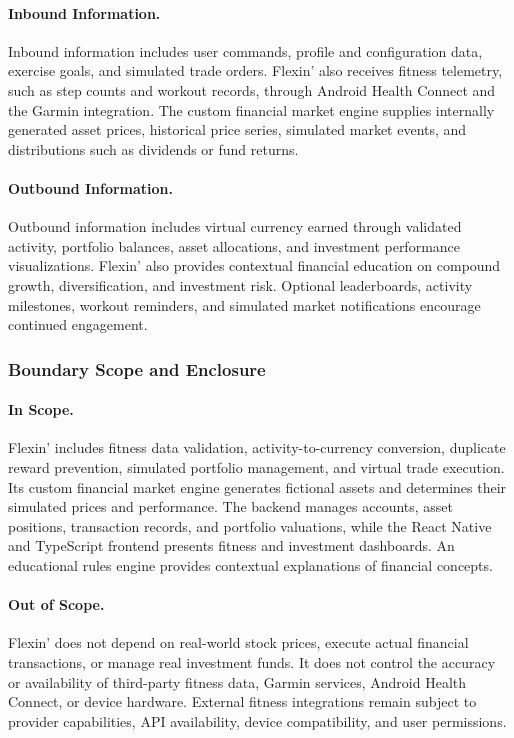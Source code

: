 \documentclass[12pt]{article}
\begin{document}
\paragraph{Inbound Information.}
Inbound information includes user commands, profile and configuration
data, exercise goals, and simulated trade orders. Flexin' also receives
fitness telemetry, such as step counts and workout records, through
Android Health Connect and the Garmin integration. The custom financial
market engine supplies internally generated asset prices, historical
price series, simulated market events, and distributions such as
dividends or fund returns.

\paragraph{Outbound Information.}
Outbound information includes virtual currency earned through validated
activity, portfolio balances, asset allocations, and investment
performance visualizations. Flexin' also provides contextual financial
education on compound growth, diversification, and investment risk.
Optional leaderboards, activity milestones, workout reminders, and
simulated market notifications encourage continued engagement.

\subsubsection{Boundary Scope and Enclosure}

\paragraph{In Scope.}
Flexin' includes fitness data validation, activity-to-currency
conversion, duplicate reward prevention, simulated portfolio
management, and virtual trade execution. Its custom financial market
engine generates fictional assets and determines their simulated
prices and performance. The backend manages accounts, asset positions,
transaction records, and portfolio valuations, while the React Native
and TypeScript frontend presents fitness and investment dashboards.
An educational rules engine provides contextual explanations of
financial concepts.

\paragraph{Out of Scope.}
Flexin' does not depend on real-world stock prices, execute actual
financial transactions, or manage real investment funds. It does not
control the accuracy or availability of third-party fitness data,
Garmin services, Android Health Connect, or device hardware. External
fitness integrations remain subject to provider capabilities, API
availability, device compatibility, and user permissions.
\end{document}
